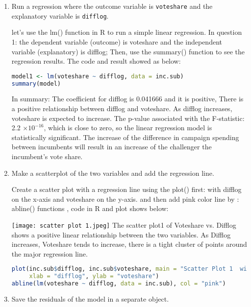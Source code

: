 \documentclass[12pt,letterpaper]{article}
\begin{document}
\newpage
	\begin{enumerate}
		\item Run a regression where the outcome variable is \texttt{voteshare} and the explanatory variable is \texttt{difflog}.
  
\noindent let's use the lm() function in R  to run a simple linear regression. In question 1: the dependent variable (outcome) is voteshare and the independent variable (explanatory) is difflog; Then, use the summary() function to see the regression results. The code  and result showed as below: 

  \begin{lstlisting}[language=R] 
model1 <- lm(voteshare ~ difflog, data = inc.sub)
summary(model)
 \end{lstlisting} 


\noindent In summary: The coefficient for difflog is 0.041666 and it is positive, There is a positive relationship between difflog and voteshare. As difflog increases, voteshare is expected to increase. The p-value associated with the F-statistic: 2.2 $\times 10^{-16}$,  
which is close to zero, so the linear regression model is statistically significant.  The increase of the difference in campaign spending between incumbents will result in an increase of the  challenger the incumbent’s vote share.

\newpage
\item Make a scatterplot of the two variables and add the regression line. 	

Create a scatter plot with a regression line using the plot() first:  with difflog on the x-axis and voteshare on the y-axis.  and  then add  pink color line by : abline() functions , code in R and plot shows below:

 \texttt{[image: scatter plot 1.jpeg]} 
The scatter plot1  of Voteshare vs. Difflog shows a positive linear relationship between the two variables. As Difflog increases, Voteshare tends to increase, there is a tight cluster of points around the major regression line. 

\begin{lstlisting}[language=R] 
plot(inc.sub$difflog, inc.sub$voteshare, main = "Scatter Plot 1  with Regression Line", 
     xlab = "difflog", ylab = "voteshare")
abline(lm(voteshare ~ difflog, data = inc.sub), col = "pink")

\end{lstlisting} 
  

		\item Save the residuals of the model in a separate object.	


\end{enumerate}
\end{document}

